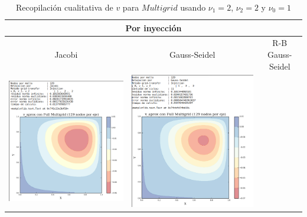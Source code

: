 \documentclass[letter,10pt]{article}
\begin{document}
\begin{table}[H]
\centering
\caption{Recopilación cualitativa de $v$ para $Multigrid$ usando $\nu_1=2$, $\nu_2=2$ y $\nu_0=1$}
\begin{tabular}[t]{|c|c|c|}
\hline
\multicolumn{3}{|c|}{Por inyección} \\ \hline
Jacobi & Gauss-Seidel & R-B Gauss-Seidel\\ \hline 
\includegraphics[scale=0.38]{img/fmg/mgjacobi129Ninjection}& \includegraphics[scale=0.35]{img/fmg/mgGS129Ninjection}&

\end{tabular}
\end{table}
\end{document}
